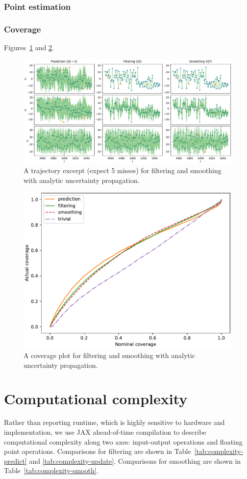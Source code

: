 \documentclass[oneside, article]{memoir}
\begin{document}
\subsection{Point estimation}
\subsection{Coverage}
Figures~\ref{fig:analytic-trajectory} and \ref{fig:analytic-coverage}.
\begin{figure}
  \includegraphics[width=\linewidth]{../figures/analytic-trajectory.pdf}
  \caption{\label{fig:analytic-trajectory} A trajectory excerpt (expect 5 misses) for filtering and smoothing with analytic uncertainty propagation.}
\end{figure}
\begin{figure}
\includegraphics[width=0.5\linewidth]{../figures/analytic-coverage.pdf}
\caption{\label{fig:analytic-coverage} A coverage plot for filtering and smoothing with analytic uncertainty propagation.}
\end{figure}

\appendix
\chapter{Computational complexity}
Rather than reporting runtime, which is highly sensitive to hardware
and implementation, we use JAX ahead-of-time compilation to describe
computational complexity along two axes: input-output operations and
floating point operations.
Comparisons for filtering are shown in
Table~\ref{tab:complexity-predict} and \ref{tab:complexity-update}.
Comparisons for smoothing are shown in Table~\ref{tab:complexity-smooth}.
\end{document}
